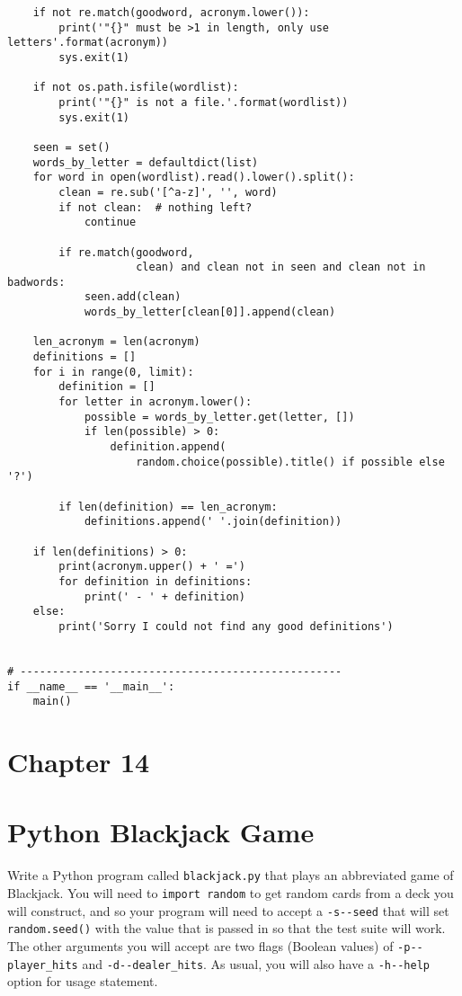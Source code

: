 \documentclass[]{article}
\begin{document}
\begin{verbatim}
    if not re.match(goodword, acronym.lower()):
        print('"{}" must be >1 in length, only use letters'.format(acronym))
        sys.exit(1)

    if not os.path.isfile(wordlist):
        print('"{}" is not a file.'.format(wordlist))
        sys.exit(1)

    seen = set()
    words_by_letter = defaultdict(list)
    for word in open(wordlist).read().lower().split():
        clean = re.sub('[^a-z]', '', word)
        if not clean:  # nothing left?
            continue

        if re.match(goodword,
                    clean) and clean not in seen and clean not in badwords:
            seen.add(clean)
            words_by_letter[clean[0]].append(clean)

    len_acronym = len(acronym)
    definitions = []
    for i in range(0, limit):
        definition = []
        for letter in acronym.lower():
            possible = words_by_letter.get(letter, [])
            if len(possible) > 0:
                definition.append(
                    random.choice(possible).title() if possible else '?')

        if len(definition) == len_acronym:
            definitions.append(' '.join(definition))

    if len(definitions) > 0:
        print(acronym.upper() + ' =')
        for definition in definitions:
            print(' - ' + definition)
    else:
        print('Sorry I could not find any good definitions')


# --------------------------------------------------
if __name__ == '__main__':
    main()
\end{verbatim}

\pagebreak

\hypertarget{chapter-14}{%
\section{Chapter 14}\label{chapter-14}}

\hypertarget{python-blackjack-game}{%
\section{Python Blackjack Game}\label{python-blackjack-game}}

Write a Python program called \texttt{blackjack.py} that plays an
abbreviated game of Blackjack. You will need to \texttt{import\ random}
to get random cards from a deck you will construct, and so your program
will need to accept a \texttt{-s\textbar{}-\/-seed} that will set
\texttt{random.seed()} with the value that is passed in so that the test
suite will work. The other arguments you will accept are two flags
(Boolean values) of \texttt{-p\textbar{}-\/-player\_hits} and
\texttt{-d\textbar{}-\/-dealer\_hits}. As usual, you will also have a
\texttt{-h\textbar{}-\/-help} option for usage statement.
\end{document}

